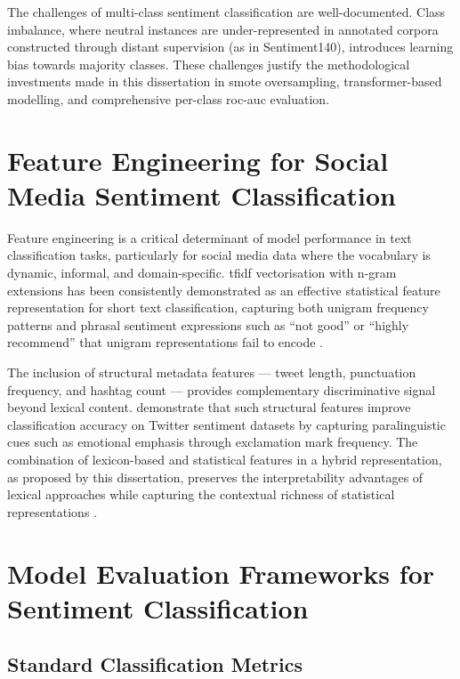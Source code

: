 The challenges of multi-class sentiment classification are well-documented. Class imbalance, where neutral instances are under-represented in annotated corpora constructed through distant supervision (as in Sentiment140), introduces learning bias towards majority classes. These challenges justify the methodological investments made in this dissertation in \gls{smote} oversampling, transformer-based modelling, and comprehensive per-class \gls{roc}-\gls{auc} evaluation.

\section{Feature Engineering for Social Media Sentiment Classification}

Feature engineering is a critical determinant of model performance in text classification tasks, particularly for social media data where the vocabulary is dynamic, informal, and domain-specific. \gls{tfidf} vectorisation with n-gram extensions has been consistently demonstrated as an effective statistical feature representation for short text classification, capturing both unigram frequency patterns and phrasal sentiment expressions such as ``not good'' or ``highly recommend'' that unigram representations fail to encode \citep{ramos2003using,pang2008opinion}.

The inclusion of structural metadata features --- tweet length, punctuation frequency, and hashtag count --- provides complementary discriminative signal beyond lexical content. \citet{rill2014politwi} demonstrate that such structural features improve classification accuracy on Twitter sentiment datasets by capturing paralinguistic cues such as emotional emphasis through exclamation mark frequency. The combination of lexicon-based and statistical features in a hybrid representation, as proposed by this dissertation, preserves the interpretability advantages of lexical approaches while capturing the contextual richness of statistical representations \citep{thelwall2010sentiment}.

\section{Model Evaluation Frameworks for Sentiment Classification}

\subsection{Standard Classification Metrics}

